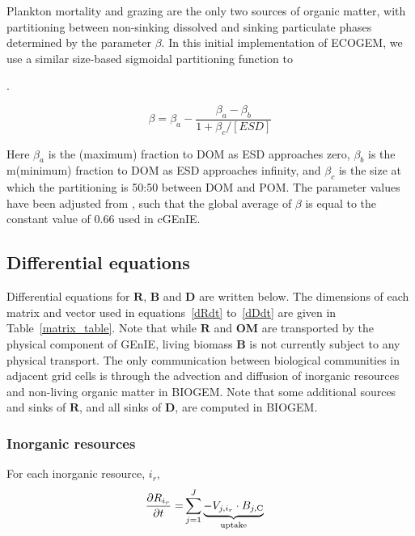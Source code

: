 \documentclass[gmd, manuscript]{copernicus}
\begin{document}
Plankton mortality and grazing are the only two sources of organic matter, with partitioning between non-sinking dissolved and sinking particulate phases determined by the parameter $\beta$. In this initial implementation of ECOGEM, we use a similar size-based sigmoidal partitioning function to  \citet{Ward:2016}{.

\begin{equation} 
\beta = \beta_{a} - \frac{\beta_{a}-\beta_{b}}{1+\beta_{c}/[ESD]}
\label{eqn_beta}
\end{equation}

Here $\beta_{a}$ is the (maximum) fraction to DOM as ESD approaches zero, $\beta_{b}$ is the m(minimum) fraction to DOM as ESD approaches infinity, and $\beta_c$ is the size at which the partitioning is 50:50 between DOM and POM. The parameter values have been adjusted from \citet{Ward:2016}, such that the global average of $\beta$ is equal to the constant value of 0.66 used in cGEnIE. 

\subsection{Differential equations}\label{PDEs}

Differential equations for ${\mathbf R}$, ${\mathbf B}$ and ${\mathbf D}$ are written below. The dimensions of each matrix and vector used in equations~\ref{dRdt} to~\ref{dDdt} are given in Table~\ref{matrix_table}. Note that while $\mathbf{R}$ and $\mathbf{OM}$ are transported by the physical component of GEnIE, living biomass $\mathbf{B}$ is not currently subject to any physical transport. The only communication between biological communities in adjacent grid cells is through the advection and diffusion of inorganic resources and non-living organic matter in BIOGEM. Note that some additional sources and sinks of $\mathbf{R}$, and all sinks of $\mathbf{D}$, are computed in BIOGEM.

\subsubsection{Inorganic resources}

For each inorganic resource, $i_r$, 
%
\begin{align}
\frac{\partial {R_{i_r}}}{\partial t} = & \sum_{j=1}^{J} \underbrace{-V_{j,i_r} \cdot B_{j,{\rm C}} }_{\rm uptake}
 \label{dRdt}
\end{align}
%

}
\end{document}
